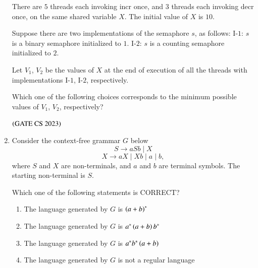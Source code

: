 \documentclass[journal,12pt,onecolumn]{IEEEtran}
\theoremstyle{remark}
\begin{document}
\begin{enumerate}
	There are $5$ threads each invoking incr once, and $3$ threads each invoking decr once, on the same shared variable $X$. The initial value of $X$ is $10$.
	
	Suppose there are two implementations of the semaphore $s$, as follows: I-$1$: $s$ is a binary semaphore initialized to $1$. I-$2$: $s$ is a counting semaphore initialized to $2$.
	
	Let $V_1$, $V_2$ be the values of $X$ at the end of execution of all the threads with implementations I-$1$, I-$2$, respectively.
	
	Which one of the following choices corresponds to the minimum possible values of $V_1$, $V_2$, respectively?
	
	\hfill $\left(\text{GATE CS 2023}\right)$
	
	\begin{enumerate}
	\end{enumerate}

		
		\item Consider the context-free grammar $G$ below
		$$S \to aSb \mid X$$
		$$X \to aX \mid Xb \mid a \mid b,$$
		where $S$ and $X$ are non-terminals, and $a$ and $b$ are terminal symbols. The starting non-terminal is $S$.
		
		Which one of the following statements is CORRECT?
		
		\hfill{\brak{\text{GATE CS 2023}}}
		
		\begin{enumerate}

				\item The language generated by $G$ is $\left(a + b\right)^*$
				\item The language generated by $G$ is $a^* \left(a + b\right) b^*$
				\item The language generated by $G$ is $a^* b^* \left(a + b\right)$
				\item The language generated by $G$ is not a regular language

		\end{enumerate}
		

\end{enumerate}
\end{document}
